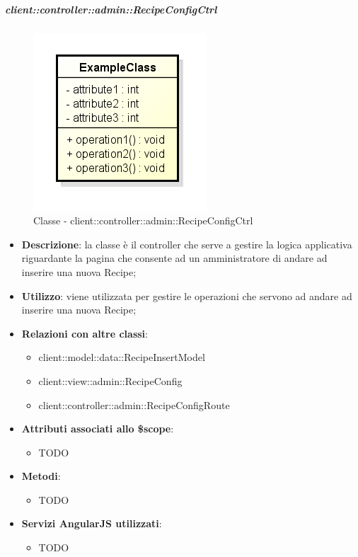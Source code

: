 		\subparagraph{client::controller::admin::RecipeConfigCtrl} %
		\label{subp:bdsm_app_client_controller_admin_recipeconfigctrl}
			\begin{figure}[htbp]
				\centering
				\centerline{\includegraphics[scale=0.7]{./images/client/classes/example_class.png}}
				\caption{Classe - client::controller::admin::RecipeConfigCtrl}
			\end{figure}
			\begin{itemize}
				\item \textbf{Descrizione}: la classe è il controller che serve a gestire la logica applicativa riguardante la pagina che consente ad un amministratore di andare ad inserire una nuova Recipe;
				\item \textbf{Utilizzo}: viene utilizzata per gestire le operazioni che servono ad andare ad inserire una nuova Recipe;
				\item \textbf{Relazioni con altre classi}:
					\begin{itemize}
						\item client::model::data::RecipeInsertModel
						\item client::view::admin::RecipeConfig
						\item client::controller::admin::RecipeConfigRoute
					\end{itemize}

				\item \textbf{Attributi associati allo \$scope}:
					\begin{itemize}
						\item TODO
					\end{itemize}

				\item \textbf{Metodi}:
					\begin{itemize}
						\item TODO
					\end{itemize}

				\item \textbf{Servizi AngularJS utilizzati}:
					\begin{itemize}
						\item TODO
					\end{itemize}

			\end{itemize}

